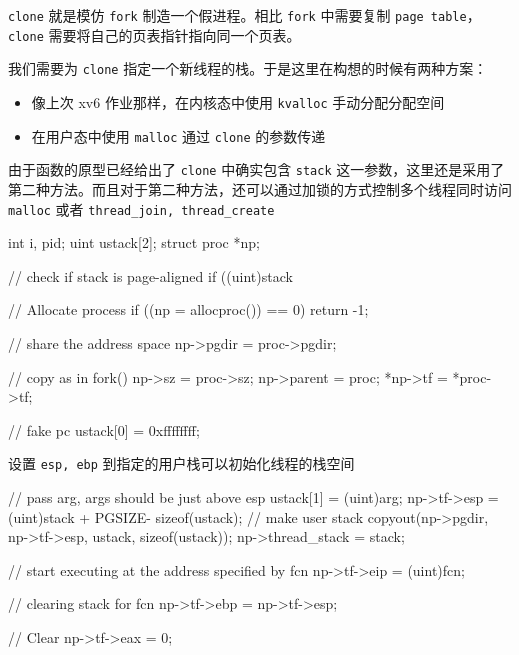 \texttt{clone} 就是模仿 \texttt{fork} 制造一个假进程。相比 \texttt{fork} 中需要复制 \texttt{page table}，\texttt{clone} 需要将自己的页表指针指向同一个页表。

我们需要为 \texttt{clone} 指定一个新线程的栈。于是这里在构想的时候有两种方案：

\begin{itemize}
    \item 像上次 xv6 作业那样，在内核态中使用 \texttt{kvalloc} 手动分配分配空间
    \item 在用户态中使用 \texttt{malloc} 通过 \texttt{clone} 的参数传递
\end{itemize}

由于函数的原型已经给出了 \texttt{clone} 中确实包含 \texttt{stack} 这一参数，这里还是采用了第二种方法。而且对于第二种方法，还可以通过加锁的方式控制多个线程同时访问 \texttt{malloc} 或者 \texttt{thread\_join, thread\_create}

\begin{ccode}
    int i, pid;
    uint ustack[2];
    struct proc *np;
                    
    // check if stack is page-aligned
    if ((uint)stack %
                    
    // Allocate process
    if ((np = allocproc()) == 0)
    return -1;
                    
    // share the address space
    np->pgdir = proc->pgdir;
                    
    // copy as in fork()
    np->sz = proc->sz;
    np->parent = proc;
    *np->tf = *proc->tf;
                    
    // fake pc
    ustack[0] = 0xffffffff;
                    
\end{ccode}

设置 \texttt{esp, ebp} 到指定的用户栈可以初始化线程的栈空间

\begin{ccode}
    // pass arg, args should be just above esp
    ustack[1] = (uint)arg;
    np->tf->esp = (uint)stack + PGSIZE- sizeof(ustack);
    // make user stack
    copyout(np->pgdir, np->tf->esp, ustack, sizeof(ustack));
    np->thread_stack = stack;
                  
    // start executing at the address specified by fcn
    np->tf->eip = (uint)fcn;
                  
    // clearing stack for fcn
    np->tf->ebp = np->tf->esp;
                  
    // Clear %
    np->tf->eax = 0;
\end{ccode}

